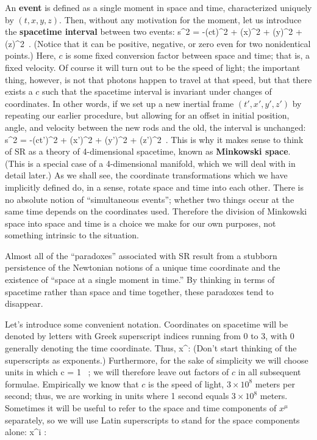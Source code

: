 \documentclass[12pt]{article}
\begin{document}
An {\bf event} is defined as a single moment in space and time, characterized
uniquely by $(t,x,y,z)$.
Then, without any motivation for the moment, let us introduce the 
{\bf spacetime interval} between two events:
\be
  s^2 = -(c\Delta t)^2 + (\Delta x)^2 + (\Delta y)^2 + (\Delta z)^2\ .
  \label{1.3}
\ee
(Notice that it can be positive, negative, or zero even for two nonidentical
points.) Here, $c$ is some fixed conversion factor between space and time; 
that is, a fixed velocity.  Of course it will turn out to be the speed of 
light; the important thing, however, is not that photons happen to travel at 
that speed, but that there exists a $c$ such that the spacetime interval is
invariant under changes of coordinates.  In other words, if we set up a new
inertial frame $(t',x',y',z')$ by repeating our earlier procedure, but allowing
for an offset in initial position, angle, and velocity between the new rods and
the old, the interval is unchanged:
\be
  s^2 = -(c\Delta t')^2 + (\Delta x')^2 + (\Delta y')^2 + (\Delta z')^2\ .
  \label{1.4}
\ee
This is why it makes sense to think of SR as a theory of 4-dimensional
spacetime, known as {\bf Minkowski space}.  (This is a special case
of a 4-dimensional manifold, which we will deal with in detail later.)
As we shall see, the coordinate transformations which we have
implicitly defined do, in a sense, rotate space and time into each other.
There is no absolute notion of ``simultaneous events''; whether two things
occur at the same time depends on the coordinates used.  Therefore the
division of Minkowski space into space and time is a choice we make for 
our own purposes, not something intrinsic to the situation.

Almost all of the ``paradoxes'' associated with SR result from a stubborn
persistence of the Newtonian notions of a unique time coordinate and the
existence of ``space at a single moment in time.''
By thinking in terms of spacetime rather than space and time together,
these paradoxes tend to disappear.

Let's introduce some convenient notation.  Coordinates on spacetime will
be denoted by letters with Greek superscript indices running from $0$ to
$3$, with $0$ generally denoting the time coordinate.  Thus,
\be
  x^\mu :\quad {}
  \label{1.5}
\ee
(Don't start thinking of the superscripts as exponents.)  Furthermore, for
the sake of simplicity we will choose units in which
\be
  c = 1 \ ;\label{1.6}
\ee
we will therefore leave out factors of $c$ in all subsequent formulae.
Empirically we know that $c$ is the speed of light, $3\times 10^8$ meters
per second; thus, we are working in units where 1 second equals $3\times 10^8$ 
meters.  Sometimes it will be useful to refer to the space and time 
components of $x^\mu$ separately, so we will use Latin superscripts to
stand for the space components alone:
\be
  x^i :\quad {}\label{1.7}
\ee
\end{document}
